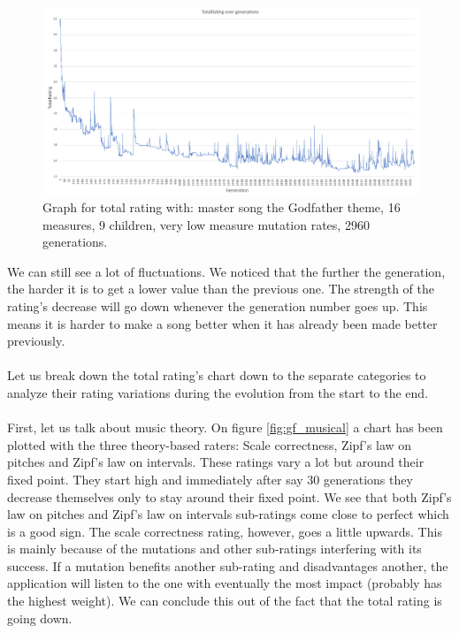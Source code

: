 \documentclass[a4paper]{article}
\begin{document}
\begin{figure}[H]
	\advance\leftskip-1.5cm
	\includegraphics[width=1.2\textwidth]{Fotos/results/gf/total_rating_graph.png}
	\caption{Graph for total rating with: master song the Godfather theme, 16 measures, 9 children, very low measure mutation rates, 2960 generations.}
	\label{fig:gf_1}
\end{figure}

We can still see a lot of fluctuations. We noticed that the further the generation, the harder it is to get a lower value than the previous one. The strength of the rating's decrease will go down whenever the generation number goes up. This means it is harder to make a song better when it has already been made better previously.
\\\\
Let us break down the total rating's chart down to the separate categories to analyze their rating variations during the evolution from the start to the end.
\\\\
First, let us talk about music theory. On figure \ref{fig:gf_musical} a chart has been plotted with the three theory-based raters: Scale correctness, Zipf's law on pitches and Zipf's law on intervals. These ratings vary a lot but around their fixed point. They start high and immediately after say 30 generations they decrease themselves only to stay around their fixed point. We see that both Zipf's law on pitches and Zipf's law on intervals sub-ratings come close to perfect which is a good sign. The scale correctness rating, however, goes a little upwards. This is mainly because of the mutations and other sub-ratings interfering with its success. If a mutation benefits another sub-rating and disadvantages another, the application will listen to the one with eventually the most impact (probably has the highest weight). We can conclude this out of the fact that the total rating is going down.
\end{document}
